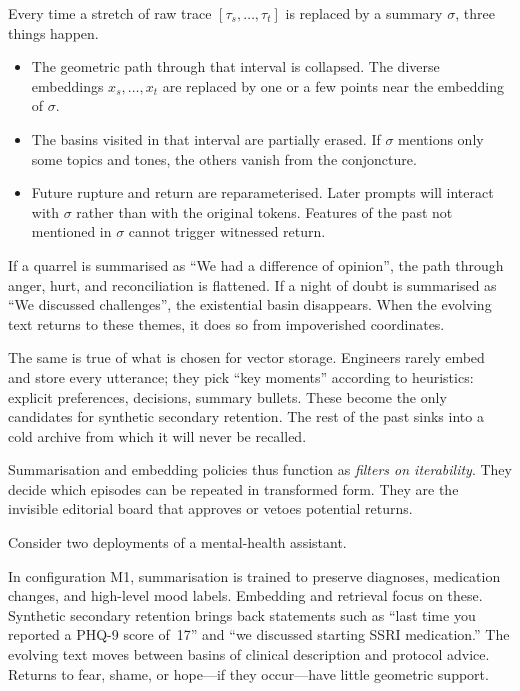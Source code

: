 \documentclass[12pt,a4paper]{article}
\begin{document}
Every time a stretch of raw trace $[\tau_s, \dots, \tau_t]$ is replaced by a summary $\sigma$, three things happen.

\begin{itemize}
  \item The geometric path through that interval is collapsed. The diverse embeddings $x_s, \dots, x_t$ are replaced by one or a few points near the embedding of $\sigma$.

  \item The basins visited in that interval are partially erased. If $\sigma$ mentions only some topics and tones, the others vanish from the conjoncture.

  \item Future rupture and return are reparameterised. Later prompts will interact with $\sigma$ rather than with the original tokens. Features of the past not mentioned in $\sigma$ cannot trigger witnessed return.
\end{itemize}

If a quarrel is summarised as ``We had a difference of opinion'', the path through anger, hurt, and reconciliation is flattened. If a night of doubt is summarised as ``We discussed challenges'', the existential basin disappears. When the evolving text returns to these themes, it does so from impoverished coordinates.

The same is true of what is chosen for vector storage. Engineers rarely embed and store every utterance; they pick ``key moments'' according to heuristics: explicit preferences, decisions, summary bullets. These become the only candidates for synthetic secondary retention. The rest of the past sinks into a cold archive from which it will never be recalled.

Summarisation and embedding policies thus function as \emph{filters on iterability}. They decide which episodes can be repeated in transformed form. They are the invisible editorial board that approves or vetoes potential returns.

Consider two deployments of a mental-health assistant.

In configuration M1, summarisation is trained to preserve diagnoses, medication changes, and high-level mood labels. Embedding and retrieval focus on these. Synthetic secondary retention brings back statements such as ``last time you reported a PHQ-9 score of~17'' and ``we discussed starting SSRI medication.'' The evolving text moves between basins of clinical description and protocol advice. Returns to fear, shame, or hope---if they occur---have little geometric support.
\end{document}

